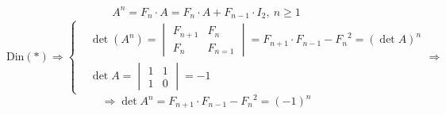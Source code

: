 \documentclass[12pt]{article}
\theoremstyle{definition}
\begin{document}
	\[\begin{aligned}
	A^n=F_n \cdot A = F_n \cdot A + F_{n-1} \cdot I_2,\  n \ge 1
	\end{aligned}\]
	\[ \text{Din} (\boldsymbol{*}) \Rightarrow  \left\{\begin{aligned} &\det(A^n) = \begin{vmatrix}
	F_{n+1}	& F_{n}\\
	F_{n}	& F_{n=1}
	\end{vmatrix}= F_{n+1} \cdot F_{n-1} - {F_n}^2 = (\det{A})^n \\
	&\det{A} = \begin{vmatrix}
	1&1\\
	1&0
	\end{vmatrix}=-1 \end{aligned}
	\right. \Rightarrow\] \[ \Rightarrow \det{A^n} = F_{n+1} \cdot F_{n-1} - {F_n}^2 = (-1)^n \]
\end{document}
